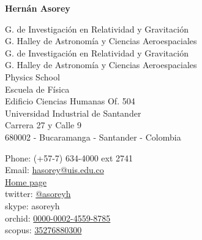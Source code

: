 \begin{center}{\huge \bf Hernán Asorey}\\[1cm]\end{center}

\begin{minipage}[t]{0.595\textwidth}
\ifeng
  G. de Investigación en Relatividad y Gravitación \\
  G. Halley de Astronomía y Ciencias Aeroespaciales \\
\else
  G. de Investigación en Relatividad y Gravitación \\
  G. Halley de Astronomía y Ciencias Aeroespaciales \\
\fi
\ifeng 
  Physics School\\
\else
  Escuela de Física\\
\fi
  Edificio Ciencias Humanas Of. 504\\
  Universidad Industrial de Santander\\
  Carrera 27 y Calle 9\\
  680002 - Bucaramanga - Santander - Colombia\\
  [.2cm]
\end{minipage}
\begin{minipage}[t]{0.395\textwidth}
  Phone: (+57-7) 634-4000 ext 2741\\
  Email: \href{mailto:hasorey@uis.edu.co}{hasorey@uis.edu.co}\\
  \href{http://fisica.cab.cnea.gov.ar/particulas/wiki/User:Asoreyh}{Home page}\\
  twitter: \href{https://twitter.com/#!/asoreyh}{@asoreyh}\\
  skype: asoreyh\\
  orchid: \href{http://orcid.org/0000-0002-4559-8785}{0000-0002-4559-8785}\\
  scopus: \href{http://www.scopus.com/authid/detail.url?authorId=35276880300}{35276880300}
\end{minipage}


